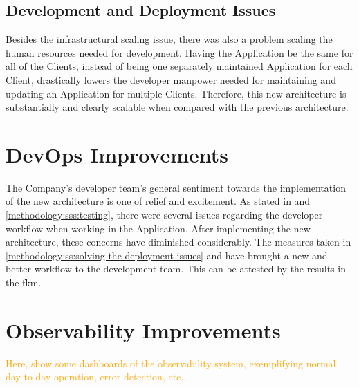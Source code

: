\subsection{Development and Deployment Issues}

Besides the infrastructural scaling issue, there was also a problem scaling the human resources needed for development. Having the Application be the same for all of the Clients, instead of being one separately maintained Application for each Client, drastically lowers the developer manpower needed for maintaining and updating an Application for multiple Clients. Therefore, this new architecture is substantially and clearly scalable when compared with the previous architecture.

\section{DevOps Improvements}\label{results-and-discussion:ss:devops-improvements}

The Company's developer team's general sentiment towards the implementation of the new architecture is one of relief and excitement. As stated in  and \cref{methodology:sss:testing}, there were several issues regarding the developer workflow when working in the Application. After implementing the new architecture, these concerns have diminished considerably. The measures taken in \cref{methodology:ss:solving-the-deployment-issues} and  have brought a new and better workflow to the development team. This can be attested by the results in the \gls{fkm}.



\section{Observability Improvements}\label{results-and-discussion:ss:observability-improvements}

\textcolor{orange}{Here, show some dashboards of the observability system, exemplifying normal day-to-day operation, error detection, etc...}

